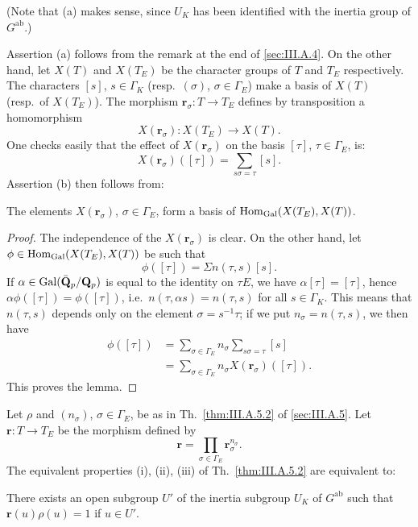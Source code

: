 (Note that (a) makes sense, since $U_K$ has been identified with the
inertia group of $G^{\mathrm{ab}}$.)

Assertion (a) follows from the remark at the end of \ref{sec:III.A.4}.
On the other hand, let $X(T)$ and $X(T_E)$ be the character groups of
$T$ and $T_E$ respectively.  The characters $[s]$, $s\in\Gamma_K$
(resp.\ $(\sigma)$, $\sigma\in\Gamma_E$) make a basis of $X(T)$
(resp.\ of $X(T_E)$).  The morphism
$\mathbf{r}_\sigma\colon T\to T_E$ defines by transposition a
homomorphism
\[
X(\mathbf{r}_\sigma)\colon X(T_E)\to X(T).
\]
One checks easily that the effect of $X(\mathbf{r}_\sigma)$ on the
basis $[\tau]$, $\tau\in\Gamma_E$, is:
\[
X(\mathbf{r}_\sigma)([\tau])=\sum_{s\sigma=\tau}[s].
\]
Assertion (b) then follows from:

\begin{lemma}
The elements $X(\mathbf{r}_\sigma)$, $\sigma\in\Gamma_E$, form a basis
of $\mathrm{Hom}_{\mathrm{Gal}}(X(T_E),X(T))$.
\end{lemma}

\begin{proof}
The independence of the $X(\mathbf{r}_\sigma)$ is clear.  On the other
hand, let $\phi\in\mathrm{Hom}_{\mathrm{Gal}}(X(T_E),X(T))$ be such that
\[
\phi([\tau])=\Sigma n(\tau,s)[s].
\]
If $\alpha\in\mathrm{Gal}(\bar{\mathbf{Q}}_p/\mathbf{Q}_p)$ is equal to the identity on
$\tau E$, we have $\alpha[\tau]=[\tau]$, hence
$\alpha\phi([\tau])=\phi([\tau])$, i.e.\ $n(\tau,\alpha s)=n(\tau,s)$
for all $s\in\Gamma_K$.  This means that $n(\tau,s)$ depends only on
the element $\sigma=s^{-1}\tau$; if we put $n_\sigma=n(\tau,s)$, we
then have
\begin{align*}
\phi([\tau])&=\sum_{\sigma\in\Gamma_E} n_\sigma
\sum_{s\sigma=\tau}[s]\\
&=\sum_{\sigma\in\Gamma_E} n_\sigma
X(\mathbf{r}_\sigma)([\tau]).
\end{align*}
This proves the lemma.
\end{proof}

\begin{proposition}[6]\label{prop:III.A.6.6}
Let $\rho$ and $(n_\sigma)$, $\sigma\in\Gamma_E$, be as in
Th.~\ref{thm:III.A.5.2} of \ref{sec:III.A.5}.  Let
$\mathbf{r}\colon T\to T_E$ be the morphism defined by
\[
\mathbf{r}=\prod_{\sigma\in\Gamma_E}
\mathbf{r}_\sigma^{n_\sigma}.
\]
The equivalent properties (i), (ii), (iii) of
Th.~\ref{thm:III.A.5.2} are equivalent to:
\begin{nlist}
\item[\emph{(iv)}] There exists an open subgroup $U'$ of the inertia
subgroup $U_K$ of $G^{\mathrm{ab}}$ such that
$\mathbf{r}(u)\rho(u)=1$ if $u\in U'$.
\end{nlist}
\end{proposition}

